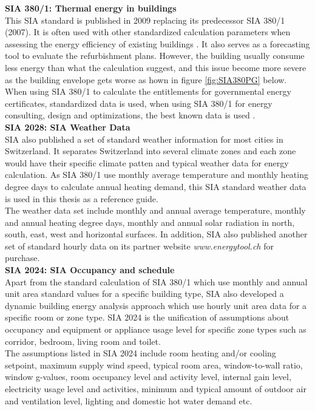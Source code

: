 \documentclass[11pt, a4paper]{article}
\theoremstyle{definition}
\begin{document}
		\textbf{SIA 380/1: Thermal energy in buildings}\\
			This SIA standard is published in 2009 replacing its predecessor SIA 380/1 (2007). It is often used with other standardized calculation parameters when assessing the energy efficiency of existing buildings \cite{SIAPreviousreport}. It also serves as a forecasting tool to evaluate the refurbishment plans. However, the building usually consume less energy than what the calculation suggest, and this issue become more severe as the building envelope gets worse as hown in figure \ref{fig:SIA380PG} below. When using SIA 380/1 to calculate the entitlements for governmental energy certificates, standardized data is used, when using SIA 380/1 for energy consulting, design and optimizations, the best known data is used \cite{SIAPreviousreport}.\\




		\textbf{SIA 2028: SIA Weather Data}\\
			SIA also published a set of standard weather information for most cities in Switzerland. It separates Switzerland into several climate zones and each zone would have their specific climate patten and typical weather data for energy calculation. As SIA 380/1 use monthly average temperature and monthly heating degree days to calculate annual heating demand, this SIA standard weather data is used in this thesis as a reference guide.\\

			The weather data set include monthly and annual average temperature, monthly and annual heating degree days, monthly and annual solar radiation in north, south, east, west and horizontal surfaces. In addition, SIA also published another set of standard hourly data on its partner website \textit{www.energytool.ch} for purchase.\\

		\textbf{SIA 2024: SIA Occupancy and schedule}\\
			Apart from the standard calculation of SIA 380/1 which use monthly and annual unit area standard values for a specific building type, SIA also developed a dynamic building energy analysis approach which use hourly unit area data for a specific room or zone type. SIA 2024 is the unification of assumptions about occupancy and equipment or appliance usage level for specific zone types such as corridor, bedroom, living room and toilet.\\

			The assumptions listed in SIA 2024 include room heating and/or cooling setpoint, maximum supply wind speed, typical room area, window-to-wall ratio, window g-values, room occupancy level and activity level, internal gain level, electricity usage level and activities, minimum and typical amount of outdoor air and ventilation level, lighting and domestic hot water demand etc.\\
\end{document}
